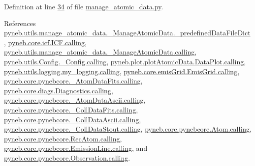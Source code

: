 Definition at line \hyperlink{manage__atomic__data_8py_source_l00034}{34} of file \hyperlink{manage__atomic__data_8py_source}{manage\-\_\-atomic\-\_\-data.\-py}.



References \hyperlink{manage__atomic__data_8py_source_l00019}{pyneb.\-utils.\-manage\-\_\-atomic\-\_\-data.\-\_\-\-Manage\-Atomic\-Data.\-\_\-predefined\-Data\-File\-Dict}, \hyperlink{icf_8py_source_l00016}{pyneb.\-core.\-icf.\-I\-C\-F.\-calling}, \hyperlink{manage__atomic__data_8py_source_l00018}{pyneb.\-utils.\-manage\-\_\-atomic\-\_\-data.\-\_\-\-Manage\-Atomic\-Data.\-calling}, \hyperlink{_config_8py_source_l00032}{pyneb.\-utils.\-Config.\-\_\-\-Config.\-calling}, \hyperlink{plot_atomic_data_8py_source_l00042}{pyneb.\-plot.\-plot\-Atomic\-Data.\-Data\-Plot.\-calling}, \hyperlink{logging_8py_source_l00044}{pyneb.\-utils.\-logging.\-my\-\_\-logging.\-calling}, \hyperlink{emis_grid_8py_source_l00044}{pyneb.\-core.\-emis\-Grid.\-Emis\-Grid.\-calling}, \hyperlink{pynebcore_8py_source_l00097}{pyneb.\-core.\-pynebcore.\-\_\-\-Atom\-Data\-Fits.\-calling}, \hyperlink{diags_8py_source_l00169}{pyneb.\-core.\-diags.\-Diagnostics.\-calling}, \hyperlink{pynebcore_8py_source_l00318}{pyneb.\-core.\-pynebcore.\-\_\-\-Atom\-Data\-Ascii.\-calling}, \hyperlink{pynebcore_8py_source_l00585}{pyneb.\-core.\-pynebcore.\-\_\-\-Coll\-Data\-Fits.\-calling}, \hyperlink{pynebcore_8py_source_l00936}{pyneb.\-core.\-pynebcore.\-\_\-\-Coll\-Data\-Ascii.\-calling}, \hyperlink{pynebcore_8py_source_l01156}{pyneb.\-core.\-pynebcore.\-\_\-\-Coll\-Data\-Stout.\-calling}, \hyperlink{pynebcore_8py_source_l01229}{pyneb.\-core.\-pynebcore.\-Atom.\-calling}, \hyperlink{pynebcore_8py_source_l02643}{pyneb.\-core.\-pynebcore.\-Rec\-Atom.\-calling}, \hyperlink{pynebcore_8py_source_l03385}{pyneb.\-core.\-pynebcore.\-Emission\-Line.\-calling}, and \hyperlink{pynebcore_8py_source_l03541}{pyneb.\-core.\-pynebcore.\-Observation.\-calling}.


